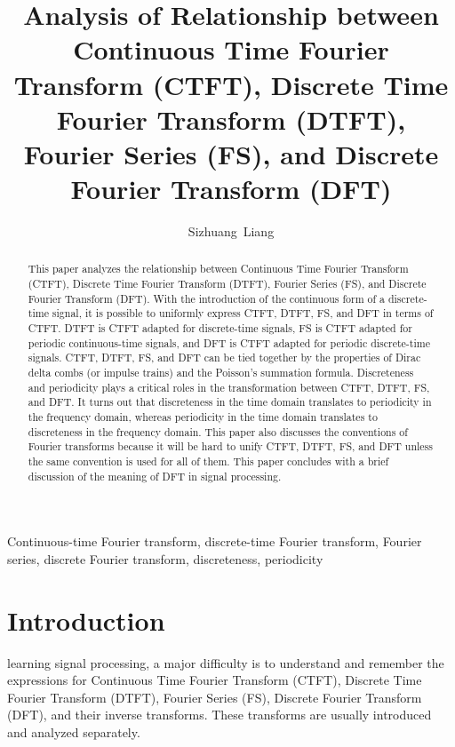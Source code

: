 \documentclass[journal,twoside]{IEEEtran}
\begin{document}
\title{Analysis of Relationship between Continuous Time Fourier Transform (CTFT), Discrete Time Fourier Transform (DTFT), Fourier Series (FS), and Discrete Fourier Transform (DFT)}

\author{Sizhuang~Liang}

\maketitle

\begin{abstract}
This paper analyzes the relationship between Continuous Time Fourier Transform (CTFT), Discrete Time Fourier Transform (DTFT), Fourier Series (FS), and Discrete Fourier Transform (DFT). With the introduction of the continuous form of a discrete-time signal, it is possible to uniformly express CTFT, DTFT, FS, and DFT in terms of CTFT. DTFT is CTFT adapted for discrete-time signals, FS is CTFT adapted for periodic continuous-time signals, and DFT is CTFT adapted for periodic discrete-time signals. CTFT, DTFT, FS, and DFT can be tied together by the properties of Dirac delta combs (or impulse trains) and the Poisson's summation formula. Discreteness and periodicity plays a critical roles in the transformation between CTFT, DTFT, FS, and DFT. It turns out that discreteness in the time domain translates to periodicity in the frequency domain, whereas periodicity in the time domain translates to discreteness in the frequency domain. This paper also discusses the conventions of Fourier transforms because it will be hard to unify CTFT, DTFT, FS, and DFT unless the same convention is used for all of them. This paper concludes with a brief discussion of the meaning of DFT in signal processing.
\end{abstract}

\begin{IEEEkeywords}
Continuous-time Fourier transform, discrete-time Fourier transform, Fourier series, discrete Fourier transform, discreteness, periodicity
\end{IEEEkeywords}


\section{Introduction}

 learning signal processing, a major difficulty is to understand and remember the expressions for Continuous Time Fourier Transform (CTFT), Discrete Time Fourier Transform (DTFT), Fourier Series (FS), Discrete Fourier Transform (DFT), and their inverse transforms. These transforms are usually introduced and analyzed separately.
\end{document}

